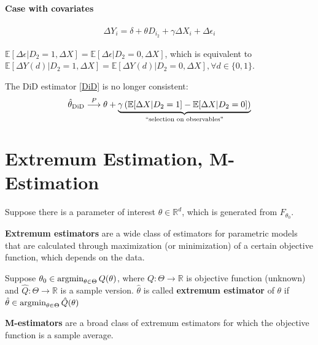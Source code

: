 \documentclass[11pt]{elegantbook}
\newcommand{\argmin}{\operatornamewithlimits{argmin}}
\begin{document}
\paragraph*{Case with covariates}
\begin{equation}
    \begin{aligned}
        \Delta Y_i=\delta+\theta D_{i_2}+\gamma\Delta X_i+\Delta\epsilon_i
    \end{aligned}
    \nonumber
\end{equation}
\begin{assumption}
    $\mathbb{E}[\Delta\epsilon|D_2=1,\Delta X]=\mathbb{E}[\Delta\epsilon|D_2=0,\Delta X]$, which is equivalent to $\mathbb{E}[\Delta Y(d)|D_2=1,\Delta X]=\mathbb{E}[\Delta Y(d)|D_2=0,\Delta X],\forall d\in\{0,1\}$.
\end{assumption}

\begin{remark}
    The DiD estimator \eqref{DiD} is no longer consistent:
    \begin{equation}
        \begin{aligned}
            \hat{\theta}_\textnormal{DiD} \stackrel{P}{\longrightarrow} \theta+\underbrace{\gamma\left(\mathbb{E}[\Delta X|D_2=1]-\mathbb{E}[\Delta X|D_2=0]\right)}_\textnormal{``selection on observables''}
        \end{aligned}
        \nonumber
    \end{equation}
\end{remark}


\section{Extremum Estimation, M-Estimation}
Suppose there is a parameter of interest $\theta\in \mathbb{R}^d$, which is generated from $F_{\theta_0}$.

\textbf{Extremum estimators} are a wide class of estimators for parametric models that are calculated through maximization (or minimization) of a certain objective function, which depends on the data.

Suppose $\theta_0\in\argmin_{\theta\in\Theta} Q(\theta)$, where $Q: \Theta \rightarrow \mathbb{R}$ is objective function (unknown) and $\hat{Q}: \Theta \rightarrow \mathbb{R}$ is a sample version. $\hat{\theta}$ is called \textbf{extremum estimator} of $\theta$ if $\hat{\theta}\in\argmin_{\theta\in\Theta} \hat{Q}(\theta)$

\textbf{M-estimators} are a broad class of extremum estimators for which the objective function is a sample average.
\end{document}
